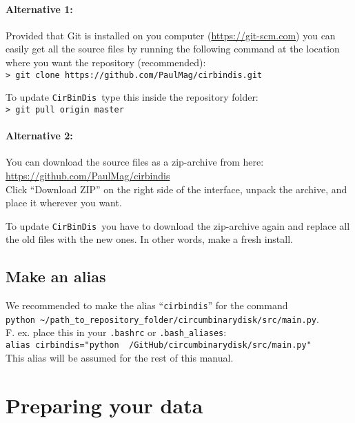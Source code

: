 \documentclass[a4paper, 12pt, english, titlepage]{article}
\newcommand{\sname}{\texttt{CirBinDis }}
\begin{document}
    \paragraph{Alternative 1:}
    Provided that Git is installed on you computer (\url{https://git-scm.com}) you can easily get all the source files by running the following command at the location where you want the repository (recommended): \\
    \texttt{> git clone https://github.com/PaulMag/cirbindis.git}
    
    To update \sname type this inside the repository folder: \\
    \texttt{> git pull origin master}

    \paragraph{Alternative 2:}
    You can download the source files as a zip-archive from here: \\
    \url{https://github.com/PaulMag/cirbindis} \\
    Click ``Download ZIP'' on the right side of the interface,
    unpack the archive, and place it wherever you want.

    To update \sname you have to download the zip-archive again and replace all the old files with the new ones. In other words, make a fresh install.


\subsection{Make an alias}
    We recommended to make the alias ``\texttt{cirbindis}'' for the command \\
    \texttt{python \textasciitilde/path\_to\_repository\_folder/circumbinarydisk/src/main.py}. \\
    F. ex. place this in your \texttt{.bashrc} or \texttt{.bash\_aliases}: \\
    \texttt{alias cirbindis="python ~/GitHub/circumbinarydisk/src/main.py"} \\
    This alias will be assumed for the rest of this manual.


\section{Preparing your data}
\end{document}
